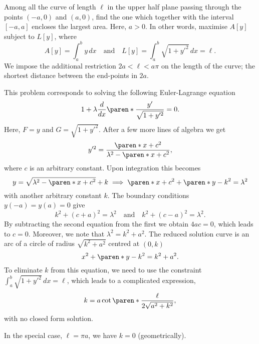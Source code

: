 \documentclass[11pt]{penrose}
\begin{document}
\begin{negg}
    Among all the curve of length $\ell$ in the upper half plane passing through the points $(-a, 0)$ and $(a, 0)$, find the one which together with the interval $[-a, a]$ encloses the largest area. Here, $a > 0$. In other words, maximise $A[y]$ subject to $L[y]$, where
    \begin{equation}
        A[y] = \int_a^b y \,dx
        \quad\text{and}\quad
        L[y] = \int_a^b \sqrt{1 + y'^2} \,dx = \ell.
    \end{equation}
    We impose the additional restriction $2a < \ell < a\pi$ on the length of the curve; the shortest distance between the end-points in $2a$.

    This problem corresponds to solving the following Euler-Lagrange equation
    \begin{equation}
        1 + \lambda \frac{d}{dx} \paren*{ \frac{y'}{\sqrt{1+y'^2}} } = 0.
    \end{equation}
    Here, $F = y$ and $G = \sqrt{1 + y'^2}$. After a few more lines of algebra we get
    \begin{equation}
        y'^2 = \frac{\paren*{x+c}^2}{\lambda^2 - \paren*{x+c}^2},
    \end{equation}
    where $c$ is an arbitrary constant. Upon integration this becomes
    \begin{equation}
        y = \sqrt{\lambda^2 - \paren*{x+c}^2} + k
        \implies
        \paren*{x+c}^2 + \paren*{y-k}^2 = \lambda^2
    \end{equation}
    with another arbitrary constant $k$. The boundary conditions $y(-a) = y(a) = 0$ give
    \begin{equation}
        k^2 + (c+a)^2 = \lambda^2
        \quad\text{and}\quad
        k^2 + (c-a)^2 = \lambda^2.
    \end{equation}
    By subtracting the second equation from the first we obtain $4ac = 0$, which leads to $c = 0$. Moreover, we note that $\lambda^2 = k^2 + a^2$. The reduced solution curve is an arc of a circle of radius $\sqrt{k^2 + a^2}$ centred at $(0, k)$
    \begin{equation}
        x^2 + \paren*{y-k}^2 = k^2 + a^2.
    \end{equation}
    To eliminate $k$ from this equation, we need to use the constraint $\int_a^b \sqrt{1 + y'^2} \,dx = \ell$, which leads to a complicated expression,
    \begin{equation}
        k = a \cot\paren*{\frac{\ell}{2 \sqrt{a^2 + k^2}}},
    \end{equation}
    with no closed form solution.

    In the special case, $\ell = \pi a$, we have $k = 0$ (geometrically).
\end{negg}
\end{document}
